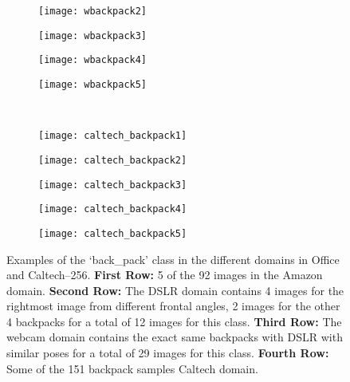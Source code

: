 \documentclass{article}
\begin{document}
\begin{figure}[th]
        \begin{subfigure}[b]{0.18\linewidth}
        \centering
        \texttt{[image: wbackpack2]}
    \end{subfigure}    \hfill
        \begin{subfigure}[b]{0.18\linewidth}
        \centering
        \texttt{[image: wbackpack3]}
    \end{subfigure}    \hfill
        \begin{subfigure}[b]{0.18\linewidth}
        \centering
        \texttt{[image: wbackpack4]}
    \end{subfigure}   
    \begin{subfigure}[b]{0.18\linewidth}
        \centering
        \texttt{[image: wbackpack5]}
    \end{subfigure}  \\
    \begin{subfigure}[b]{0.18\linewidth}
        \centering
        \texttt{[image: caltech\_backpack1]}
    \end{subfigure}    \hfill
        \begin{subfigure}[b]{0.18\linewidth}
        \centering
        \texttt{[image: caltech\_backpack2]}
    \end{subfigure}    \hfill
        \begin{subfigure}[b]{0.18\linewidth}
        \centering
        \texttt{[image: caltech\_backpack3]}
    \end{subfigure}    \hfill
        \begin{subfigure}[b]{0.18\linewidth}
        \centering
        \texttt{[image: caltech\_backpack4]}
    \end{subfigure}   
    \begin{subfigure}[b]{0.18\linewidth}
        \centering
        \texttt{[image: caltech\_backpack5]}
    \end{subfigure}      
    \caption{Examples of the `back\_pack' class in the different domains in Office and Caltech--256. \textbf{First Row:} 5 of the 92 images in the Amazon domain. \textbf{Second Row:} The DSLR domain contains 4 images for the rightmost image from different frontal angles, 2 images for the other 4 backpacks for a total of 12 images for this class. \textbf{Third Row:} The webcam domain contains the exact same backpacks with DSLR with similar poses for a total of 29 images for this class. \textbf{Fourth Row:} Some of the 151 backpack samples Caltech domain.}
    \label{fig:office_pollution2}
\end{figure}
\end{document}
